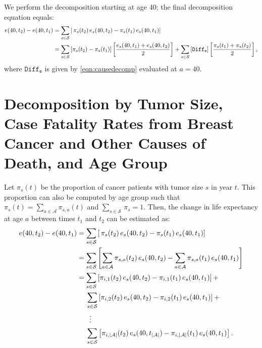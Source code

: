 \documentclass[11pt,letterpaper]{article}
\theoremstyle{plain}
\theoremstyle{remark}
\numberwithin{equation}{section}
\begin{document}
We perform the decomposition starting at age 40; the final
decomposition equation equals:
\begin{align*}
  e(40,t_2)-e(40,t_1)&=\sum_{s\in\mathcal{S}}\left[\,\pi_s(t_2)\,e_s(40,t_2)- \pi_s(t_1)\,e_s(40,t_1)\right] \notag \\
                     &=\sum_{s\in\mathcal{S}}\left[\pi_s(t_2)-\pi_s(t_1) \right]\left[\frac{e_s(40,t_1)+e_s(40,t_2)}{2}\right]+\sum_{s\in\mathcal{S}}\left[\mathtt{Diff_e} \right]\left[\frac{\pi_s(t_1)+\pi_s(t_2)}{2}\right],
\end{align*}
where $\mathtt{Diff_e}$ is given by \eqref{eqn:causedecomp} evaluated at $a=40$.\\

\section{Decomposition by Tumor Size, Case Fatality Rates from
  Breast Cancer and Other Causes of Death, and Age Group}
Let $\pi_{s}(t)$ be the proportion of cancer patients with tumor size
$s$ in year $t$. This proportion can also be computed by age group
such that $\pi_s(t)=\sum_{a\in\mathcal{A}}\pi_{s,a}(t)$ and
$\sum_{s\in\mathcal{S}}\,\pi_s=1$.  Then, the
change in life expectancy at age $a$ between times $t_1$ and $t_2$ can
be estimated as:
\begin{align*}
  e(40,t_2)-e(40,t_1)&=\sum_{s\in\mathcal{S}}\left[\,\pi_s(t_2)\,e_s(40,t_2)- \pi_s(t_1)\,e_s(40,t_1)\right] \\
                     &=\sum_{s\in\mathcal{S}} \left[\sum_{a\in\mathcal{A}}\pi_{s,a}(t_2)\,e_s(40,t_2)- \sum_{a\in\mathcal{A}}\pi_{s,a}(t_1)\,e_s(40,t_1) \right]\\
                     &=\sum_{s\in\mathcal{S}}\left[\pi_{i,1}(t_2)\,e_s(40,t_2)-
                       \pi_{i,1}(t_1)\,e_s(40,t_1)\right] +\\
                     &\hspace{0.18in}\sum_{s\in\mathcal{S}}\left[\pi_{i,2}(t_2)\,e_s(40,t_2)- \pi_{i,2}(t_1)\,e_s(40,t_1)\right] + \\
  &\phantom{=\Sigma}\vdots \\
                     &\hspace{0.18in}\sum_{s\in\mathcal{S}}\left[\pi_{i,\left\vert\mathcal{A}\right\vert}(t_2)\,e_s(40,t_{\left\vert\mathcal{A}\right\vert})- \pi_{i,\left\vert\mathcal{A}\right\vert}(t_1)\,e_s(40,t_1)\right]. \notag 
 \end{align*}
\end{document}
